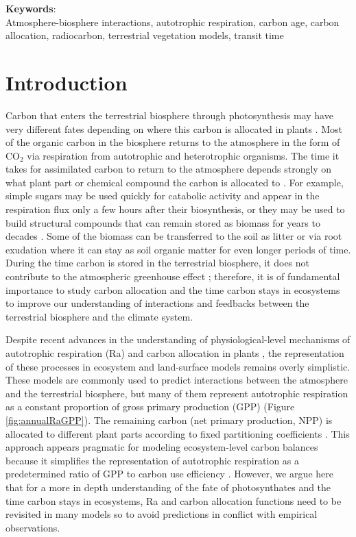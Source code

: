 \documentclass[12pt, a4paper]{article}
\begin{document}
\noindent
\textbf{Keywords}: \\
Atmosphere-biosphere interactions, autotrophic respiration, carbon age, carbon allocation, radiocarbon, terrestrial vegetation models, transit time

\section{Introduction}
Carbon that enters the terrestrial biosphere through photosynthesis may have very different fates depending on where this carbon is allocated in plants \citep{Trumbore2006}. Most of the organic carbon in the biosphere returns to the atmosphere in the form of CO$_2$ via respiration from autotrophic and heterotrophic organisms. The time it takes for assimilated carbon to return to the atmosphere depends strongly on what plant part or chemical compound the carbon is allocated to \citep{Rasmussen2016, Luo2017, Lu2018, Herrera2020}. For example, simple sugars may be used quickly for catabolic activity and appear in the respiration flux only a few hours after their biosynthesis, or they may be used to build structural compounds that can remain stored as biomass for years to decades \citep{Hartmann2016}. Some of the biomass can be transferred to the soil as litter or via root exudation where it can stay as soil organic matter for even longer periods of time. During the time carbon is stored in the terrestrial biosphere, it does not contribute to the atmospheric greenhouse effect \citep{Neubauer2015,Sierra2021BGS}; therefore, it is of fundamental importance to study carbon allocation and the time carbon stays in ecosystems to improve our understanding of interactions and feedbacks between the terrestrial biosphere and the climate system. 

Despite recent advances in the understanding of physiological-level mechanisms of autotrophic respiration (Ra) and carbon allocation in plants \citep{Hartmann2016}, the representation of these processes in ecosystem and land-surface models remains overly simplistic. These models are commonly used to predict interactions between the atmosphere and the terrestrial biosphere, but many of them represent autotrophic respiration as a constant proportion of gross primary production (GPP) (Figure \ref{fig:annualRaGPP}). The remaining carbon (net primary production, NPP) is allocated to different plant parts according to fixed partitioning coefficients \citep{Franklin2012, Ceballos2020}. This approach appears pragmatic for modeling ecosystem-level carbon balances because it simplifies the representation of autotrophic respiration as a predetermined ratio of GPP to carbon use efficiency \citep{DeLucia2007}. However, we argue here that for a more in depth understanding of the fate of photosynthates and the time carbon stays in ecosystems, Ra and carbon allocation functions need to be revisited in many models so to avoid predictions in conflict with empirical observations. 
\end{document}
